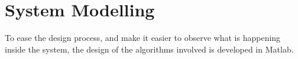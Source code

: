 \newpage
\section{System Modelling}

To ease the design process, and make it easier to observe what is happening inside the system, the design of the algorithms involved is developed in Matlab.
